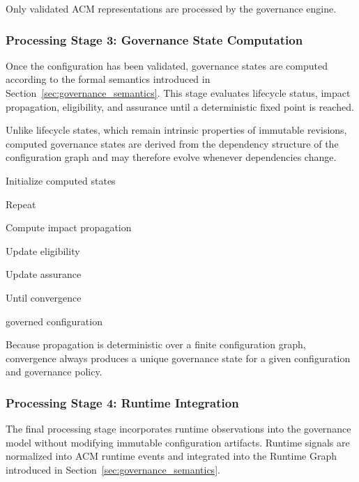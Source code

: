 \documentclass[10pt]{article}
\begin{document}
Only validated ACM representations are processed by the governance engine.

\subsubsection{Processing Stage 3: Governance State Computation}

Once the configuration has been validated, governance states are computed according to the formal semantics introduced in Section~\ref{sec:governance_semantics}. This stage evaluates lifecycle status, impact propagation, eligibility, and assurance until a deterministic fixed point is reached.

Unlike lifecycle states, which remain intrinsic properties of immutable revisions, computed governance states are derived from the dependency structure of the configuration graph and may therefore evolve whenever dependencies change.

\begin{algorithm}[ht]
\caption{Governance State Computation}

Initialize computed states\;

Repeat

\Indp

Compute impact propagation\;

Update eligibility\;

Update assurance\;

\Indm

Until convergence\;

\Return governed configuration\;

\end{algorithm}

Because propagation is deterministic over a finite configuration graph, convergence always produces a unique governance state for a given configuration and governance policy.

\subsubsection{Processing Stage 4: Runtime Integration}

The final processing stage incorporates runtime observations into the governance model without modifying immutable configuration artifacts. Runtime signals are normalized into ACM runtime events and integrated into the Runtime Graph introduced in Section~\ref{sec:governance_semantics}.
\end{document}
